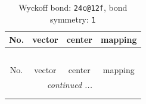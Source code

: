 \documentclass[fleqn,8pt]{jsarticle}
\begin{document}
\renewcommand{\arraystretch}{1.2}
\begin{longtable}{cccc}
\caption{Wyckoff bond: {\tt 24c@12f}, bond symmetry: {\tt 1}}
 \\
 \hline \hline
No. & vector & center & mapping \\ \hline \endfirsthead

\multicolumn{3}{l}{\tablename\ \thetable{}} \\
 \hline \hline
No. & vector & center & mapping \\ \hline \endhead

 \hline \hline
\multicolumn{3}{r}{\footnotesize\it continued ...} \\ \endfoot

 \hline \hline
\multicolumn{3}{r}{} \\ \endlastfoot


\end{longtable}
\end{document}
